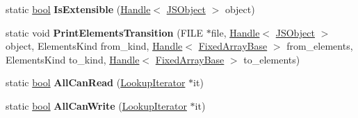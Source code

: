 \begin{DoxyCompactItemize}
\item 
\mbox{\label{classv8_1_1internal_1_1JSObject_a018dcc60df3edec9c61cd4ab49187158}} 
static \mbox{\hyperlink{classbool}{bool}} {\bfseries Is\+Extensible} (\mbox{\hyperlink{classv8_1_1internal_1_1Handle}{Handle}}$<$ \mbox{\hyperlink{classv8_1_1internal_1_1JSObject}{J\+S\+Object}} $>$ object)
\item 
\mbox{\label{classv8_1_1internal_1_1JSObject_ae3b6b123db0ee16d21150f68d6901700}} 
static void {\bfseries Print\+Elements\+Transition} (F\+I\+LE $\ast$file, \mbox{\hyperlink{classv8_1_1internal_1_1Handle}{Handle}}$<$ \mbox{\hyperlink{classv8_1_1internal_1_1JSObject}{J\+S\+Object}} $>$ object, Elements\+Kind from\+\_\+kind, \mbox{\hyperlink{classv8_1_1internal_1_1Handle}{Handle}}$<$ \mbox{\hyperlink{classv8_1_1internal_1_1FixedArrayBase}{Fixed\+Array\+Base}} $>$ from\+\_\+elements, Elements\+Kind to\+\_\+kind, \mbox{\hyperlink{classv8_1_1internal_1_1Handle}{Handle}}$<$ \mbox{\hyperlink{classv8_1_1internal_1_1FixedArrayBase}{Fixed\+Array\+Base}} $>$ to\+\_\+elements)
\item 
\mbox{\label{classv8_1_1internal_1_1JSObject_a2519dad54d82b7dcd1e1c5325b7dd445}} 
static \mbox{\hyperlink{classbool}{bool}} {\bfseries All\+Can\+Read} (\mbox{\hyperlink{classv8_1_1internal_1_1LookupIterator}{Lookup\+Iterator}} $\ast$it)
\item 
\mbox{\label{classv8_1_1internal_1_1JSObject_a3aa961becd98dcad9973ea001f71f99b}} 
static \mbox{\hyperlink{classbool}{bool}} {\bfseries All\+Can\+Write} (\mbox{\hyperlink{classv8_1_1internal_1_1LookupIterator}{Lookup\+Iterator}} $\ast$it)
\end{DoxyCompactItemize}
